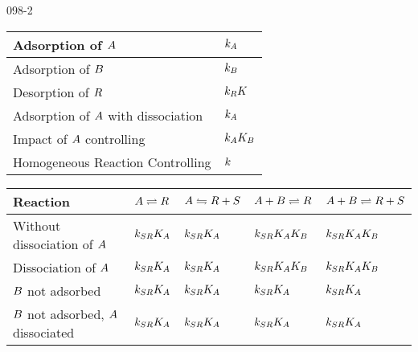 \begin{mitframe}{098-2}
    
\begin{center}
\begin{tabular}
{| >{\centering\arraybackslash}m{6cm} | >{\centering\arraybackslash}m{1cm} |}
\hline 
    Adsorption of $\helmholtz$ & $\thermcond_{\helmholtz}$ \\ \hline
	Adsorption of $\exergy$ & $\thermcond_{\exergy}$ \\ \hline
    Desorption of $\gasconst$ & $\thermcond_{\gasconst}K$ \\ \hline
	Adsorption of $\helmholtz$ with dissociation & $\thermcond_{\helmholtz}$ \\ \hline
	Impact of $\helmholtz$ controlling & $\thermcond_{\helmholtz}K_{\exergy}$\\ \hline
    Homogeneous Reaction Controlling & $\thermcond$ \\ \hline
\end{tabular}
\end{center}

\begin{center}
\begin{tabular}
{| >{\centering\arraybackslash}m{3cm} | >{\centering\arraybackslash}m{1.5cm} | >{\centering\arraybackslash}m{2cm} | >{\centering\arraybackslash}m{2cm} | >{\centering\arraybackslash}m{2.5cm} |}
\hline 
Reaction & $\helmholtz \rightleftharpoons \gasconst$ & $\helmholtz \leftrightharpoons \gasconst + \entropy$ & $\helmholtz + \exergy \rightleftharpoons \gasconst$ & $\helmholtz + \exergy \rightleftharpoons \gasconst + \entropy$ \\ \hline
Without dissociation of $\helmholtz$ & $\thermcond_{\entropy\gasconst}K_{\helmholtz}$ & $\thermcond_{\entropy\gasconst}K_{\helmholtz}$ & $\thermcond_{\entropy\gasconst}K_{\helmholtz}K_{\exergy}$ & $\thermcond_{\entropy\gasconst}K_{\helmholtz}K_{\exergy}$ \\ \hline
Dissociation of $\helmholtz$ & $\thermcond_{\entropy\gasconst}K_{\helmholtz}$ & $\thermcond_{\entropy\gasconst}K_{\helmholtz}$ & $\thermcond_{\entropy\gasconst}K_{\helmholtz}K_{\exergy}$ & $\thermcond_{\entropy\gasconst}K_{\helmholtz}K_{\exergy}$ \\ \hline
$\exergy$ not adsorbed & $\thermcond_{\entropy\gasconst}K_{\helmholtz}$ & $\thermcond_{\entropy\gasconst}K_{\helmholtz}$ & $\thermcond_{\entropy\gasconst}K_{\helmholtz}$ & $\thermcond_{\entropy\gasconst}K_{\helmholtz}$ \\ \hline
$\exergy$ not adsorbed, $\helmholtz$ dissociated & $\thermcond_{\entropy\gasconst}K_{\helmholtz}$ & $\thermcond_{\entropy\gasconst}K_{\helmholtz}$ & $\thermcond_{\entropy\gasconst}K_{\helmholtz}$ & $\thermcond_{\entropy\gasconst}K_{\helmholtz}$ \\ \hline


\end{tabular}
\end{center}
\end{mitframe}
